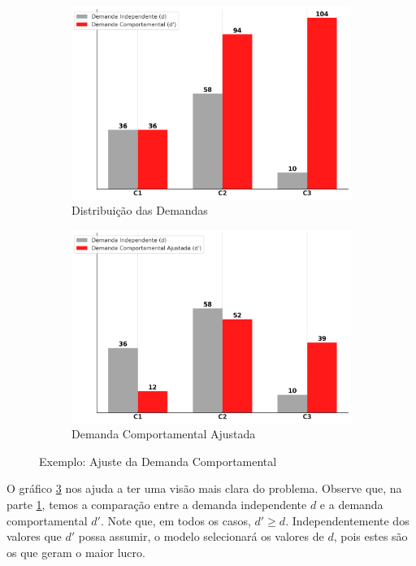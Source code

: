 \begin{figure}[H]
	\centering
	\begin{subfigure}[b]{0.45\linewidth}
		\includegraphics[width=\linewidth]{img/dem_classes.png}
		\caption{Distribuição das Demandas}
		\label{fig:dem_classes}
	\end{subfigure}\hspace{5mm}
	\begin{subfigure}[b]{0.45\linewidth}
		\includegraphics[width=\linewidth]{img/dem_redistri.png}
		\caption{Demanda Comportamental Ajustada}
		\label{fig:dem_redistri}
	\end{subfigure}
	\caption{Exemplo: Ajuste da Demanda Comportamental}
	\label{fig: ajustes_demanda}
\end{figure}

O gráfico \ref{fig: ajustes_demanda} nos ajuda a ter uma visão mais clara do problema. Observe que, na parte \ref{fig:dem_classes}, temos a comparação entre a demanda independente $d$ e a demanda comportamental $d'$. Note que, em todos os casos, $d' \geq d$. Independentemente dos valores que $d'$ possa assumir, o modelo selecionará os valores de $d$, pois estes são os que geram o maior lucro.

